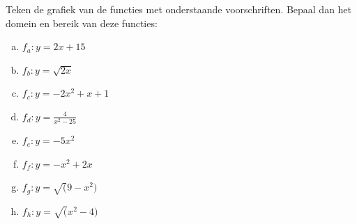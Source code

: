 \documentclass[12pt,twoside]{article}
\begin{document}
\begin{oefening}
  Teken de grafiek van de functies met onderstaande voorschriften. Bepaal dan het domein en bereik van deze functies:
  \begin{enumerate}[(a)]
    \itemsep0.8em
  \item $\displaystyle f_a : y=2x+15$
  \item $\displaystyle f_b : y=\sqrt{2x}$
  \item $\displaystyle f_c : y=-2x^2+x+1$
  \item $\displaystyle f_d : y=\frac{4}{x^2-25}$
  \item $\displaystyle f_e : y=-5x^2$
  \item $\displaystyle f_f : y=-x^2+2x$
  \item $\displaystyle f_g : y=\sqrt(9-x^2)$
  \item $\displaystyle f_h : y=\sqrt(x^2-4)$
  \end{enumerate}
\end{oefening}
\end{document}
